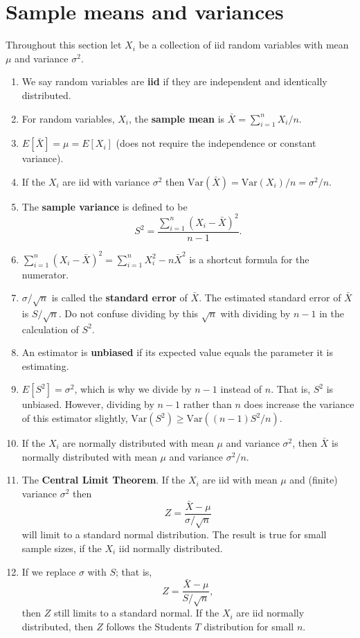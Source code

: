\documentclass[12pt]{article}
\begin{document}
\section{Sample means and variances}
Throughout this section let $X_i$ be a collection of iid random
variables with mean $\mu$ and variance $\sigma^2$.
\begin{enumerate}[1.]
\item We say random variables are {\bf iid} if they are independent and 
  identically distributed. 
\item For random variables, $X_i$, the {\bf sample mean} is $\bar X = \sum_{i=1}^nX_i / n$.
\item $E[\bar X] = \mu = E[X_i]$ (does not require the independence or constant variance).
\item If the $X_i$ are iid with variance $\sigma^2$ then
  $\mathrm{Var}(\bar X) = \mathrm{Var}(X_i) / n = \sigma^2 / n$. 
\item The {\bf sample variance} is defined to be
  $$
  S^2 = \frac{\sum_{i=1}^n (X_i - \bar X)^2}{n - 1}.
  $$
\item $\sum_{i=1}^n (X_i - \bar X)^2 = \sum_{i=1}^n X_i^2 - n\bar X^2$ is a shortcut
  formula for the numerator.
\item $\sigma / {\sqrt n}$ is called the {\bf standard error} of $\bar X$. The estimated
  standard error of $\bar X$ is $S / \sqrt{n}$. Do not confuse dividing by this $\sqrt n$
  with dividing by $n-1$ in the calculation of $S^2$.
\item An estimator is {\bf unbiased} if its expected value equals the parameter
  it is estimating.
\item $E[S^2] = \sigma^2$, which is why we divide by $n-1$ instead of
  $n$. That is, $S^2$ is unbiased. However, dividing by $n-1$
  rather than $n$ does increase the variance of this estimator
  slightly, $\mathrm{Var}(S^2) \geq \mathrm{Var}((n-1)S^2 / n)$.
\item If the $X_i$ are normally distributed with mean $\mu$ and variance $\sigma^2$, 
  then $\bar X$ is normally distributed with mean $\mu$ and variance $\sigma^2 / n$.
\item The {\bf Central Limit Theorem}. If the $X_i$ are iid with
  mean $\mu$ and (finite) variance $\sigma^2$ then
  $$
  Z = \frac{\bar X - \mu}{\sigma / \sqrt n}
  $$
  will limit to a standard normal distribution. The result is true for small sample sizes,
  if the $X_i$ iid normally distributed.
\item If we replace $\sigma$ with $S$; that is,
  $$
  Z = \frac{\bar X - \mu}{S / \sqrt n},
  $$
  then $Z$ still limits to a standard normal. If the $X_i$ are iid normally distributed,
  then $Z$ follows the Students $T$ distribution for small $n$.
\end{enumerate}
\end{document}
